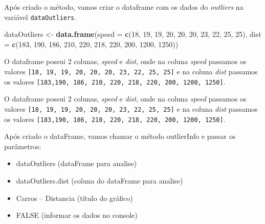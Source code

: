 \documentclass[]{article}
\newenvironment{Shaded}{\begin{snugshade}}{\end{snugshade}}
\newcommand{\CommentTok}[1]{\textcolor[rgb]{0.56,0.35,0.01}{\textit{#1}}}
\newcommand{\DataTypeTok}[1]{\textcolor[rgb]{0.13,0.29,0.53}{#1}}
\newcommand{\DecValTok}[1]{\textcolor[rgb]{0.00,0.00,0.81}{#1}}
\newcommand{\KeywordTok}[1]{\textcolor[rgb]{0.13,0.29,0.53}{\textbf{#1}}}
\newcommand{\NormalTok}[1]{#1}
\newcommand{\StringTok}[1]{\textcolor[rgb]{0.31,0.60,0.02}{#1}}
\providecommand{\tightlist}{%
  \setlength{\itemsep}{0pt}\setlength{\parskip}{0pt}}
\begin{document}
\begin{Shaded}
\begin{Highlighting}[]
{{    \CommentTok{#Retorno a variavel}
    \KeywordTok{return}\NormalTok{(}\KeywordTok{invisible}\NormalTok{(results));}
\NormalTok{\}}
\end{Highlighting}
\end{Shaded}

Após criado o método, vamos criar o dataframe com os dados do
\emph{outliers} na variável \texttt{dataOutliers}.

\begin{Shaded}
\begin{Highlighting}[]
\NormalTok{dataOutliers <-}\StringTok{ }\KeywordTok{data.frame}\NormalTok{(}\DataTypeTok{speed =} \KeywordTok{c}\NormalTok{(}\DecValTok{18}\NormalTok{, }\DecValTok{19}\NormalTok{, }\DecValTok{19}\NormalTok{, }\DecValTok{20}\NormalTok{, }\DecValTok{20}\NormalTok{, }\DecValTok{20}\NormalTok{, }\DecValTok{23}\NormalTok{, }\DecValTok{22}\NormalTok{, }\DecValTok{25}\NormalTok{, }\DecValTok{25}\NormalTok{), }\DataTypeTok{dist =} \KeywordTok{c}\NormalTok{(}\DecValTok{183}\NormalTok{, }\DecValTok{190}\NormalTok{, }\DecValTok{186}\NormalTok{, }\DecValTok{210}\NormalTok{, }\DecValTok{220}\NormalTok{, }\DecValTok{218}\NormalTok{, }\DecValTok{220}\NormalTok{, }\DecValTok{200}\NormalTok{, }\DecValTok{1200}\NormalTok{, }\DecValTok{1250}\NormalTok{))}
\end{Highlighting}
\end{Shaded}

O dataframe possui 2 colunas, \emph{speed} e \emph{dist}, onde na coluna
\emph{speed} passamos os valores
\texttt{{[}18,\ 19,\ 19,\ 20,\ 20,\ 20,\ 23,\ 22,\ 25,\ 25{]}} e na
coluna \emph{dist} passamos os valores
\texttt{{[}183,190,\ 186,\ 210,\ 220,\ 218,\ 220,\ 200,\ 1200,\ 1250{]}}.

O dataframe possui 2 colunas, \emph{speed} e \emph{dist}, onde na coluna
\emph{speed} passamos os valores
\texttt{{[}18,\ 19,\ 19,\ 20,\ 20,\ 20,\ 23,\ 22,\ 25,\ 25{]}} e na
coluna \emph{dist} passamos os valores
\texttt{{[}183,190,\ 186,\ 210,\ 220,\ 218,\ 220,\ 200,\ 1200,\ 1250{]}}.

Após criado o dataFrame, vamos chamar o método outlierInfo e passar os
parâmetros:

\begin{itemize}
\tightlist
\item
  dataOutliers (dataFrame para analise)
\item
  dataOutliers.dist (coluna do dataFrame para analise)
\item
  Carros -- Distancia (título do gráfico)
\item
  FALSE (informar os dados no console)
\end{itemize}
\end{document}
